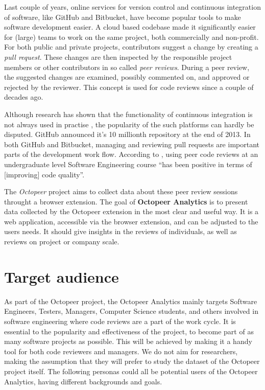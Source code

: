 \documentclass{article}
\begin{document}
Last couple of years, online services for version control and continuous integration of software, like GitHub and Bitbucket, have become popular tools to make software development easier. A cloud based codebase made it significantly easier for (large) teams to work on the same project, both commercially and non-profit. For both public and private projects, contributors suggest a change by creating a \textit{pull request}. These changes are then inspected by the responsible project members or other contributors in so called \textit{peer reviews}. During a peer review, the suggested changes are examined, possibly commented on, and approved or rejected by the reviewer. This concept is used for code reviews since a couple of decades ago. \parencite{softwareinspections}

Although research has shown that the functionality of continuous integration is not always used in practise \parencite{contin}, the popularity of the such platforms can hardly be disputed. GitHub announced it's 10 millionth repository at the end of 2013. \parencite{githubblog} In both GitHub and Bitbucket, managing and reviewing pull requests are important parts of the development work flow. According to \cite{insupportofpeercodereview}, using peer code reviews at an undergraduate level Software Engineering course ``has been positive in terms of [improving] code quality''.


The \textit{Octopeer} project aims to collect data about these peer review sessions throught a browser extension. The goal of \textbf{Octopeer Analytics} is to present data collected by the Octopeer extension in the most clear and useful way. It is a web application, accessible via the browser extension, and can be adjusted to the users needs. It should give insights in the reviews of individuals, as well as reviews on project or company scale.


\section{Target audience} \label{section:targetaudience}
As part of the Octopeer project, the Octopeer Analytics mainly targets Software Engineers, Testers, Managers, Computer Science students, and others involved in software engineering where code reviews are a part of the work cycle. It is essential to the popularity and effectiveness of the project, to become part of as many software projects as possible. This will be achieved by making it a handy tool for both code reviewers and managers. We do not aim for researchers, making the assumption that they will prefer to study the dataset of the Octopeer project itself. The following personas could all be potential users of the Octopeer Analytics, having different backgrounds and goals.
\end{document}
